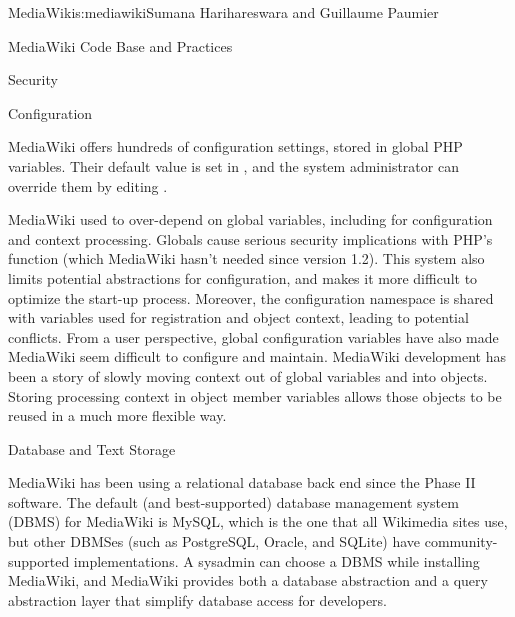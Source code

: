 \begin{aosachapter}{MediaWiki}{s:mediawiki}{Sumana Harihareswara and Guillaume Paumier}
\begin{aosasect1}{MediaWiki Code Base and Practices}
\begin{aosasect2}{Security}
\end{aosasect2}

\begin{aosasect2}{Configuration}

MediaWiki offers hundreds of configuration settings, stored in global
PHP variables. Their default value is set in
, and the system administrator can override
them by editing .

MediaWiki used to over-depend on global variables, including for
configuration and context processing. Globals cause serious security
implications with PHP's  function (which
MediaWiki hasn't needed since version 1.2). This system also limits
potential abstractions for configuration, and makes it more difficult
to optimize the start-up process. Moreover, the configuration
namespace is shared with variables used for registration and object
context, leading to potential conflicts. From a user perspective,
global configuration variables have also made MediaWiki seem difficult
to configure and maintain. MediaWiki development has been a story of
slowly moving context out of global variables and into
objects. Storing processing context in object member variables allows
those objects to be reused in a much more flexible way.

\end{aosasect2}

\end{aosasect1}

\begin{aosasect1}{Database and Text Storage}


MediaWiki has been using a relational database back end since the
Phase II software. The default (and best-supported) database
management system (DBMS) for MediaWiki is MySQL, which is the one that
all Wikimedia sites use, but other DBMSes (such as PostgreSQL, Oracle,
and SQLite) have community-supported implementations. A sysadmin can
choose a DBMS while installing MediaWiki, and MediaWiki provides both
a database abstraction and a query abstraction layer that simplify
database access for developers.


\end{aosasect1}
\end{aosachapter}
